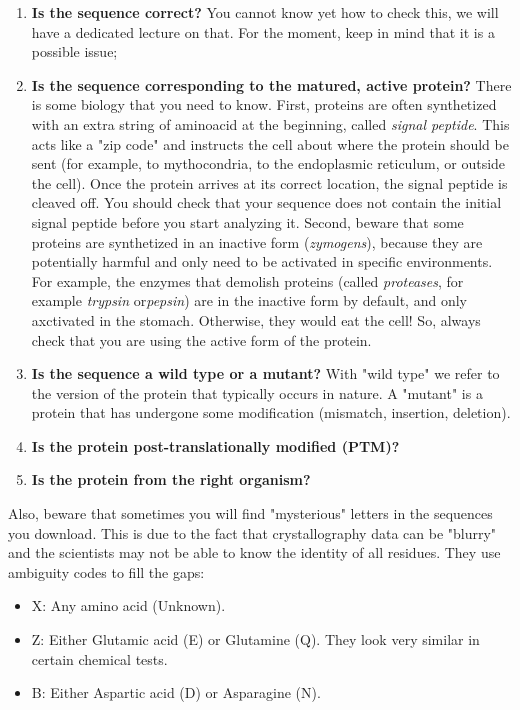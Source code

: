\begin{enumerate}
    \item  \textbf{Is the sequence correct?} You cannot know yet how to check this, we will have a dedicated lecture on that. For the moment, keep in mind that it is a possible issue;
    \item \textbf{Is the sequence corresponding to the matured, active protein?} There is some biology that you need to know. First, proteins are often synthetized with an 
    extra string of aminoacid at the beginning, called \textit{signal peptide}. This acts like a "zip code" and instructs the cell about where the protein should be sent (for example, to mythocondria, to the endoplasmic reticulum, or outside the cell).
    Once the protein arrives at its correct location, the signal peptide is cleaved off. You should check that your sequence does not contain the initial signal peptide before you start analyzing it. Second,
    beware that some proteins are synthetized in an inactive form (\textit{zymogens}), because they are potentially harmful and only need to be activated in specific environments. 
    For example, the enzymes that demolish proteins (called \textit{proteases}, for example \textit{trypsin} or\textit{pepsin}) are in the inactive form by default, and only axctivated in the stomach.
    Otherwise, they would eat the cell! So, always check that you are using the active form of the protein.
    \item \textbf{Is the sequence a wild type or a mutant?} With "wild type" we refer to the version of the protein that typically occurs in nature. A "mutant" is a protein that has undergone
    some modification (mismatch, insertion, deletion).
    \item \textbf{Is the protein post-translationally modified (PTM)?} 
    \item \textbf{Is the protein from the right organism?}
\end{enumerate}

Also, beware that sometimes you will find "mysterious" letters in the sequences you download. This is due to the fact
that crystallography data can be "blurry" and the scientists may not be able to know the identity of all residues. They use ambiguity codes to fill the gaps:

\begin{itemize}
\item X: Any amino acid (Unknown).
\item Z: Either Glutamic acid (E) or Glutamine (Q). They look very similar in certain chemical tests.
\item B: Either Aspartic acid (D) or Asparagine (N).
\end{itemize}

